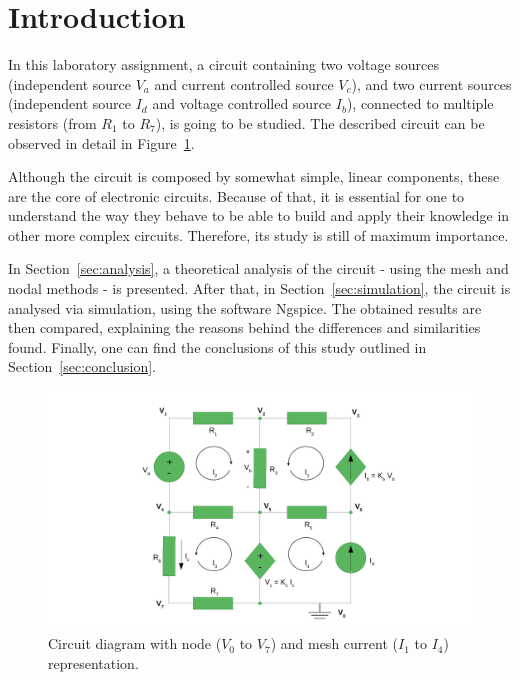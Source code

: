 \newpage
\section{Introduction}
\label{sec:introduction}
\vspace{4.5mm}
\par In this laboratory assignment, a circuit containing two voltage sources (independent source $V_a$ and current controlled source $V_c$), and two current sources (independent source $I_d$ and voltage controlled source $I_b$), connected to multiple resistors (from $R_{1}$ to $R_{7}$), is going to be studied. The described circuit can be observed in detail in Figure~\ref{fig:rc}.
\vspace{3mm}
\par Although the circuit is composed by somewhat simple, linear components, these are the core of electronic circuits. Because of that, it is essential for one to understand the way they behave to be able to build and apply their knowledge in other more complex circuits. Therefore, its study is still of maximum importance. 
\vspace{3mm}
\par In Section~\ref{sec:analysis}, a theoretical analysis of the circuit - using the mesh and nodal methods - is presented. After that, in Section~\ref{sec:simulation}, the circuit is analysed via simulation, using the software Ngspice. The obtained results are then compared, explaining the reasons behind the differences and similarities found. Finally, one can find the conclusions of this study outlined in Section~\ref{sec:conclusion}.

\begin{figure}[h] \centering
\includegraphics[scale=0.5]{rc.pdf}
\caption{Circuit diagram with node ($V_0$ to $V_7$) and mesh current ($I_1$ to $I_4$) representation.}
\label{fig:rc}
\end{figure}
